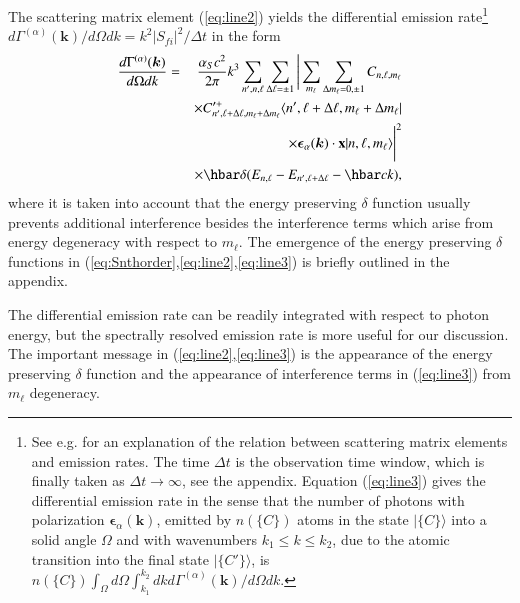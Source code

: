 \documentclass[final,3p,times,twocolumn]{elsarticle3}
\begin{document}
The scattering matrix element (\ref{eq:line2}) yields the differential 
emission rate\footnote{See e.g. \cite{heitler,rdqm} for an explanation of the
relation between scattering matrix elements and emission rates.
The time $\Delta t$ is the observation time window, which is finally taken
as $\Delta t\to\infty$, see the appendix.
Equation (\ref{eq:line3}) gives the differential emission rate in the sense
that the number of photons with polarization $\bm{\epsilon}_\alpha(\bm{k})$,
emitted by $n(\{C\})$ atoms in the 
state $\bm{|}\{C\}\bm{\rangle}$ into a solid angle $\Omega$ and with wavenumbers
$k_1\le k\le k_2$, due to the atomic
transition into the final state $\bm{|}\{C'\}\bm{\rangle}$,
is $n(\{C\})\int_{\Omega}d\Omega\int_{k_1}^{k_2}dk d\Gamma^{(\alpha)}(\bm{k})/d\Omega dk$.
}
$d\Gamma^{(\alpha)}(\bm{k})/d\Omega dk=k^2|S_{\!fi}|^2/\Delta t$ 
in the form
\begin{eqnarray}\nonumber
\frac{d\Gamma^{(\alpha)}(\bm{k})}{d\Omega dk}
&=&\frac{\alpha_S c^2}{2\pi}k^3\sum_{n',n,\ell}\sum_{\Delta\ell=\pm 1}
\Bigg|
\sum_{m_\ell}\sum_{\Delta m_\ell=0,\pm 1}
C_{n,\ell,m_\ell}
\\ \nonumber
&&\times 
C'^+_{n',\ell+\Delta\ell,m_\ell+\Delta m_\ell}
\langle n',\ell+\Delta\ell,m_\ell+\Delta m_\ell|
\\ \nonumber
&&\times 
\bm{\epsilon}_\alpha(\bm{k})\cdot\mathrm{\bf x}|n,\ell,m_\ell\rangle\Bigg|^2
\\ \label{eq:line3}
&&\times
\hbar\delta(E_{n,\ell}-E_{n',\ell+\Delta\ell}-\hbar ck),
\end{eqnarray}
where it is taken into account that the energy preserving $\delta$ function 
usually prevents additional interference besides the interference terms
which arise from energy degeneracy with respect to $m_\ell$. The emergence
of the energy preserving $\delta$ functions 
in (\ref{eq:Snthorder},\ref{eq:line2},\ref{eq:line3}) 
is briefly outlined in the appendix.

The differential emission rate can be readily integrated with respect to 
photon energy, but the spectrally resolved emission rate is more useful for 
our discussion. The important message in (\ref{eq:line2},\ref{eq:line3}) is 
the appearance of the energy preserving $\delta$ function and the appearance 
of interference terms in (\ref{eq:line3}) from $m_\ell$ degeneracy.
\end{document}
